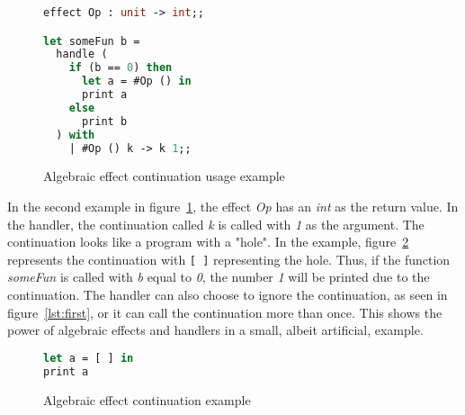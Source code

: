 \begin{figure}
\caption{Algebraic effect continuation usage example}
\label{lst:second}
\begin{lstlisting}[language=Caml]
effect Op : unit -> int;;

let someFun b = 
  handle (
    if (b == 0) then 
      let a = #Op () in
      print a
    else 
      print b
  ) with
    | #Op () k -> k 1;;
\end{lstlisting}
\end{figure}

In the second example in figure~\ref{lst:second}, the effect \textit{Op} has an \textit{int} as the return value. In the handler, the continuation called \textit{k} is called with \textit{1} as the argument. The continuation looks like a program with a "hole". In the example, figure~\ref{lst:third} represents the continuation with \lstinline{[ ]} representing the hole. Thus, if the function \textit{someFun} is called with \textit{b} equal to \textit{0}, the number \textit{1} will be printed due to the continuation. The handler can also choose to ignore the continuation, as seen in figure~\ref{lst:first}, or it can call the continuation more than once. This shows the power of algebraic effects and handlers in a small, albeit artificial, example. 

\begin{figure}
\caption{Algebraic effect continuation example}
\label{lst:third}
\begin{lstlisting}[language=Caml]
let a = [ ] in
print a
\end{lstlisting}
\end{figure}



